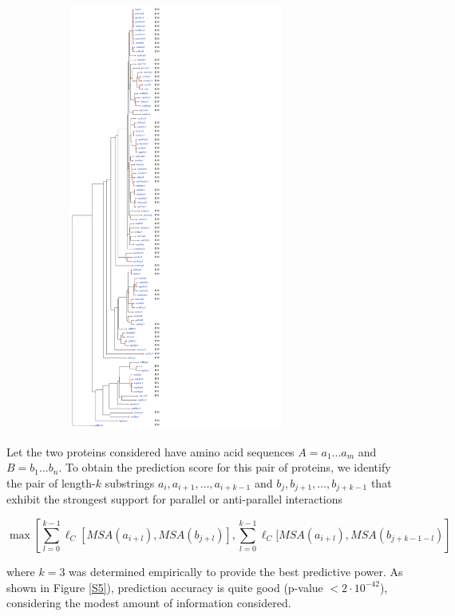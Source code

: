 \begin{figure}
\begin{subfigure}{.1\textwidth}
  \includegraphics[width=7cm]{figs/gwas_figure_4_tree_coevolution.png}
  \label{fig:sub2}
\end{subfigure}
\label{fig:gwas_jmol}
\end{figure}

Let the two proteins considered have amino acid sequences $A = a_1...a_m$ and $B = b_1...b_n$. To obtain the prediction score for this pair of proteins, we identify the pair of length-$k$ substrings $a_i, a_{i+1}, …, a_{i+k-1}$ and $b_j, b_{j+1}, …, b_{j+k-1}$ that exhibit the strongest support for parallel or anti-parallel interactions

\[
\max\left[ \sum_{l=0}^{k-1}{ \ell_C[ MSA(a_{i+l}) , MSA(b_{j+l}) ]},  \sum_{l=0}^{k-1}{\ell_C[ MSA(a_{i+l}) , MSA(b_{j+k-1-l})} \right]
\]

\noindent where $k=3$ was determined empirically to provide the best predictive power. 
As shown in Figure \ref{S5}), prediction accuracy is quite good (p-value $< 2 \cdot 10^{-42}$), considering the modest amount of information considered.

